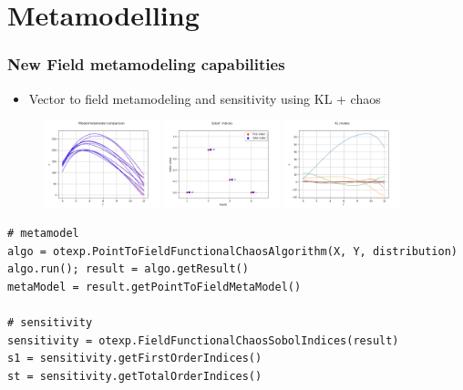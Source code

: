\documentclass[aspectratio=169]{beamer}
\begin{document}

\section{Metamodelling}

\begin{frame}[containsverbatim]
\frametitle{New Field metamodeling capabilities}
\begin{itemize}
\item Vector to field metamodeling and sensitivity using KL + chaos
\end{itemize}

\begin{figure}
   \includegraphics[width=0.3\textwidth]{figures/sphx_glr_plot_viscous_fall_metamodel_001}
   \includegraphics[width=0.3\textwidth]{figures/sphx_glr_plot_viscous_fall_metamodel_002}
   \includegraphics[width=0.3\textwidth]{figures/sphx_glr_plot_viscous_fall_metamodel_003}
\end{figure}

\begin{small}
\begin{lstlisting}
# metamodel
algo = otexp.PointToFieldFunctionalChaosAlgorithm(X, Y, distribution)
algo.run(); result = algo.getResult()
metaModel = result.getPointToFieldMetaModel()

# sensitivity
sensitivity = otexp.FieldFunctionalChaosSobolIndices(result)
s1 = sensitivity.getFirstOrderIndices()
st = sensitivity.getTotalOrderIndices()
\end{lstlisting}
\end{small}


\end{frame}
\end{document}
